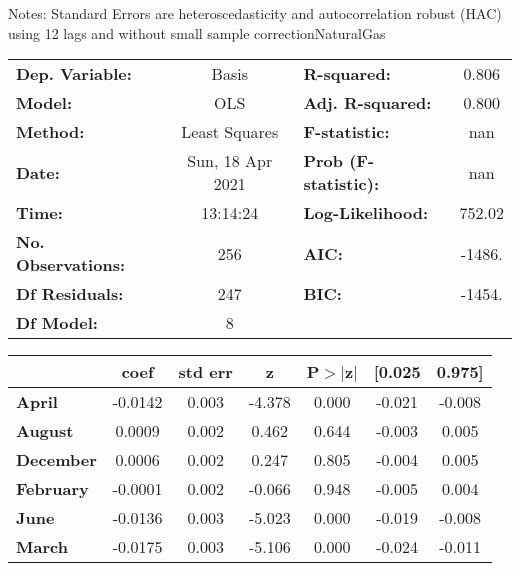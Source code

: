 Notes: \newline
 [1] Standard Errors are heteroscedasticity and autocorrelation robust (HAC) using 12 lags and without small sample correctionNaturalGas\begin{center}
\begin{tabular}{lclc}
\toprule
\textbf{Dep. Variable:}    &      Basis       & \textbf{  R-squared:         } &     0.806   \\
\textbf{Model:}            &       OLS        & \textbf{  Adj. R-squared:    } &     0.800   \\
\textbf{Method:}           &  Least Squares   & \textbf{  F-statistic:       } &       nan   \\
\textbf{Date:}             & Sun, 18 Apr 2021 & \textbf{  Prob (F-statistic):} &      nan    \\
\textbf{Time:}             &     13:14:24     & \textbf{  Log-Likelihood:    } &    752.02   \\
\textbf{No. Observations:} &         256      & \textbf{  AIC:               } &    -1486.   \\
\textbf{Df Residuals:}     &         247      & \textbf{  BIC:               } &    -1454.   \\
\textbf{Df Model:}         &           8      & \textbf{                     } &             \\
\bottomrule
\end{tabular}
\begin{tabular}{lcccccc}
                  & \textbf{coef} & \textbf{std err} & \textbf{z} & \textbf{P$> |$z$|$} & \textbf{[0.025} & \textbf{0.975]}  \\
\midrule
\textbf{April}    &      -0.0142  &        0.003     &    -4.378  &         0.000        &       -0.021    &       -0.008     \\
\textbf{August}   &       0.0009  &        0.002     &     0.462  &         0.644        &       -0.003    &        0.005     \\
\textbf{December} &       0.0006  &        0.002     &     0.247  &         0.805        &       -0.004    &        0.005     \\
\textbf{February} &      -0.0001  &        0.002     &    -0.066  &         0.948        &       -0.005    &        0.004     \\
\textbf{June}     &      -0.0136  &        0.003     &    -5.023  &         0.000        &       -0.019    &       -0.008     \\
\textbf{March}    &      -0.0175  &        0.003     &    -5.106  &         0.000        &       -0.024    &       -0.011     \\

\end{tabular}
\end{center}
